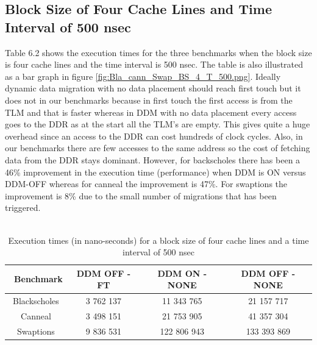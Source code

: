 \documentclass{listhesis}
\begin{document}
\subsection{Block Size of Four Cache Lines and Time Interval of 500 nsec}
Table 6.2 shows the execution times for the three benchmarks when the block size is four cache lines and the time interval is 500 nsec. The table is also illustrated as a bar graph in figure \ref{fig:Bla_cann_Swap_BS_4_T_500.png}. Ideally dynamic data migration with no data placement should reach first touch but it does not in our benchmarks because in first touch the first access is from the TLM and that is faster whereas in DDM with no data placement every access goes to the DDR as at the start all the TLM's are empty. This gives quite a huge overhead since an access to the DDR can cost hundreds of clock cycles. Also, in our benchmarks there are few accesses to the same address so the cost of fetching data from the DDR stays dominant. However, for backscholes there has been a 46\% improvement in the execution time (performance) when DDM is ON versus DDM-OFF whereas for canneal the improvement is 47\%. For swaptions the improvement is 8\% due to the small number of migrations that has been triggered.\\
\\
\begin{table}[h!]
\begin{center}
 \begin{tabular}{|| c | c | c | c||} 
 \hline
 \ \textbf{Benchmark} & \textbf{DDM OFF - FT}  & \textbf{DDM ON - NONE}  & \textbf{DDM OFF - NONE}\\ [0.5 ex] 
 \hline\hline
  Blackscholes   &   3 762 137   &   11 343 765	    &  21 157 717 \\ 
 \hline
   Canneal  	&   3 498 151    &   21 753 905   	&   41 357 304   \\
 \hline
    Swaptions   &   9 836 531     &   122 806 943 	&   133 393 869   \\
 \hline
\end{tabular}
 \caption{Execution times (in nano-seconds) for a block size of four cache lines and a time interval of 500 nsec}
 \label{table:ExecTimes2}
\end{center}
\end{table}
\end{document}
